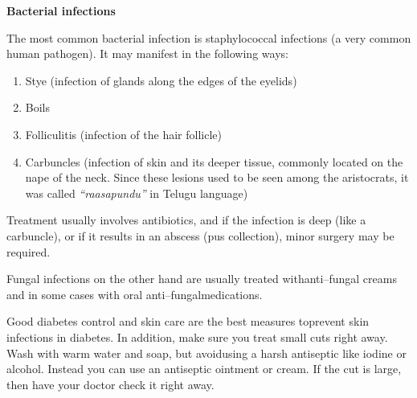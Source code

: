 \noindent\textbf{Bacterial infections}

The most common bacterial infection is staphylococcal infections (a very common human pathogen). It may manifest in the following ways:

\vspace{-\topsep}
\begin{enumerate}[•]
\itemsep=0pt
\item Stye (infection of glands along the edges of the eyelids)
\item Boils
\item Folliculitis (infection of the hair follicle)
\item Carbuncles (infection of skin and its deeper tissue, commonly located on the nape of the neck. Since these lesions used to be seen among the aristocrats, it was called \textit{“raasapundu”} in Telugu language)
\end{enumerate}
\vspace{-\topsep}

Treatment usually involves antibiotics, and if the infection is deep (like a carbuncle), or if it results in an abscess (pus collection), minor surgery may be required.

Fungal infections on the other hand are usually treated with\break anti–fungal creams and in some cases with oral anti–fungal\break medications.

Good diabetes control and skin care are the best measures to\break prevent skin infections in diabetes. In addition, make sure you treat small cuts right away. Wash with warm water and soap, but avoid\break using a harsh antiseptic like iodine or alcohol. Instead you can use an antiseptic ointment or cream. If the cut is large, then have your doctor check it right away.

\vskip 16pt

